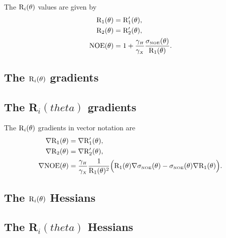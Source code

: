 The $\mathrm{R}_i(\theta)$ values are given by
\begin{subequations}
\begin{align}
    \mathrm{R}_1(\theta) & = \mathrm{R}_1'(\theta), \label{eq: Ri trans: R1} \\
    \mathrm{R}_2(\theta) & = \mathrm{R}_2'(\theta), \label{eq: Ri trans: R2} \\
    \mathrm{NOE}(\theta) & = 1 + \frac{\gamma_{\scriptscriptstyle H}}{\gamma_{\scriptscriptstyle X}} \frac{\sigma_{\scriptscriptstyle \mathrm{NOE}}(\theta)}{\mathrm{R}_1(\theta)}. \label{eq: Ri trans: NOE}
\end{align}
\end{subequations}


\begin{latexonly}
    \subsection{The $\mathrm{R}_i(\theta)$ gradients}
\end{latexonly}
\begin{htmlonly}
    \subsection{The R$_i(theta)$ gradients}
\end{htmlonly}

The $\mathrm{R}_i(\theta)$ gradients in vector notation are
\begin{subequations}
\begin{align}
    \nabla \mathrm{R}_1(\theta) & = \nabla \mathrm{R}_1'(\theta), \label{eq: Ri trans: dR1} \\
    \nabla \mathrm{R}_2(\theta) & = \nabla \mathrm{R}_2'(\theta), \label{eq: Ri trans: dR2} \\
    \nabla \mathrm{NOE}(\theta) & = \frac{\gamma_{\scriptscriptstyle H}}{\gamma_{\scriptscriptstyle X}} \frac{1}{\mathrm{R}_1(\theta)^2} \Big(
        \mathrm{R}_1(\theta) \nabla \sigma_{\scriptscriptstyle \mathrm{NOE}}(\theta) - \sigma_{\scriptscriptstyle \mathrm{NOE}}(\theta) \nabla \mathrm{R}_1(\theta)
    \Big). \label{eq: Ri trans: dNOE}
\end{align}
\end{subequations}


\begin{latexonly}
    \subsection{The $\mathrm{R}_i(\theta)$ Hessians}
\end{latexonly}
\begin{htmlonly}
    \subsection{The R$_i(theta)$ Hessians}
\end{htmlonly}

